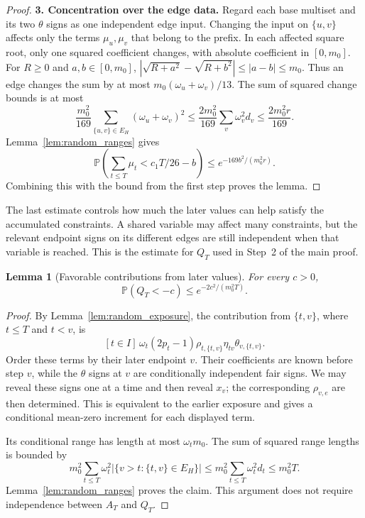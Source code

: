 \documentclass[11pt,a4paper]{article}
\newtheorem{lemma}[theorem]{Lemma}
\theoremstyle{definition}
\theoremstyle{remark}
\newcommand{\Prb}{\mathbb P}
\begin{document}
\begin{proof}
\par\medskip\noindent\textbf{3. Concentration over the edge data.}
Regard each base multiset and its two $\theta$ signs as one independent
edge input. Changing the input on $\{u,v\}$ affects only the terms
$\mu_u,\mu_v$ that belong to the prefix. In each affected square root,
only one squared coefficient changes, with absolute coefficient in
$[0,m_0]$. For $R\ge0$ and $a,b\in[0,m_0]$,
$|\sqrt{R+a^2}-\sqrt{R+b^2}|\le|a-b|\le m_0$.
Thus an edge changes the sum by at most
$m_0(\omega_u+\omega_v)/13$.
The sum of squared change bounds is at most
\[
 \frac{m_0^2}{169}\sum_{\{u,v\}\in E_H}(\omega_u+\omega_v)^2
 \le\frac{2m_0^2}{169}\sum_v\omega_v^2d_v
 \le\frac{2m_0^2r}{169}.
\]
Lemma~\ref{lem:random_ranges} gives
\[
 \Prb\left(\sum_{t\le T}\mu_t<c_1T/26-b\right)
 \le e^{-169b^2/(m_0^2r)}.
\]
Combining this with the bound from the first step proves the lemma.
\end{proof}

The last estimate controls how much the later values can help satisfy
the accumulated constraints. A shared variable may affect many constraints,
but the relevant endpoint signs on its different edges are still
independent when that variable is reached. This is the estimate for
$Q_T$ used in Step~2 of the main proof.

\begin{lemma}[Favorable contributions from later values]\label{lem:random_compensation}
For every $c>0$,
\[
 \Prb(Q_T<-c)\le e^{-2c^2/(m_0^2T)}.
\]
\end{lemma}
\begin{proof}
By Lemma~\ref{lem:random_exposure}, the contribution from $\{t,v\}$,
where $t\le T$ and $t<v$, is
\[
 [t\in I]\,\omega_t(2p_t-1)
      \rho_{t,\{t,v\}}\eta_{tv}\theta_{v,\{t,v\}}.
\]
Order these terms by their later endpoint $v$.
Their coefficients are known before step $v$, while the $\theta$ signs
at $v$ are conditionally independent fair signs.
We may reveal these signs one at a time and then reveal $x_v$;
the corresponding $\rho_{v,e}$ are then determined.
This is equivalent to the earlier exposure and gives a conditional
mean-zero increment for each displayed term.

Its conditional range has length at most $\omega_t m_0$.
The sum of squared range lengths is bounded by
\[
 m_0^2\sum_{t\le T}\omega_t^2
        |\{v>t:\{t,v\}\in E_H\}|
 \le m_0^2\sum_{t\le T}\omega_t^2d_t
 \le m_0^2T.
\]
Lemma~\ref{lem:random_ranges} proves the claim. This argument does not
require independence between $A_T$ and $Q_T$.
\end{proof}
\end{document}
